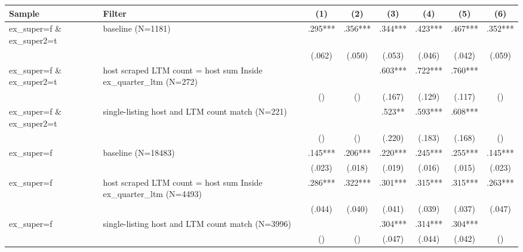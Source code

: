 \begin{tabular}{llcccccc}
\hline
Sample & Filter & (1) & (2) & (3) & (4) & (5) & (6) \\
\hline
ex\_super=f \& ex\_super2=t & baseline (N=1181) & .295*** & .356*** & .344*** & .423*** & .467*** & .352***
\\
 &  & (.062) & (.050) & (.053) & (.046) & (.042) & (.059)
\\
ex\_super=f \& ex\_super2=t & host scraped LTM count = host sum Inside ex\_quarter\_ltm (N=272) &  &  & .603*** & .722*** & .760*** & 
\\
 &  & () & () & (.167) & (.129) & (.117) & ()
\\
ex\_super=f \& ex\_super2=t & single-listing host and LTM count match (N=221) &  &  & .523** & .593*** & .608*** & 
\\
 &  & () & () & (.220) & (.183) & (.168) & ()
\\
ex\_super=f & baseline (N=18483) & .145*** & .206*** & .220*** & .245*** & .255*** & .145***
\\
 &  & (.023) & (.018) & (.019) & (.016) & (.015) & (.023)
\\
ex\_super=f & host scraped LTM count = host sum Inside ex\_quarter\_ltm (N=4493) & .286*** & .322*** & .301*** & .315*** & .315*** & .263***
\\
 &  & (.044) & (.040) & (.041) & (.039) & (.037) & (.047)
\\
ex\_super=f & single-listing host and LTM count match (N=3996) &  &  & .304*** & .314*** & .304*** & 
\\
 &  & () & () & (.047) & (.044) & (.042) & ()
\\
\hline
\end{tabular}
